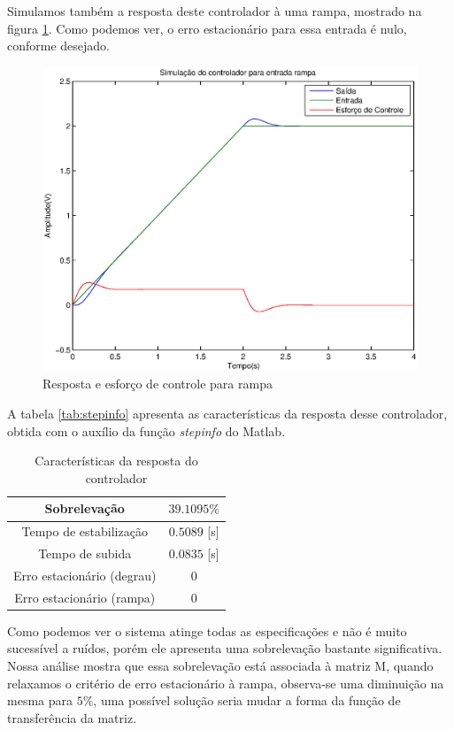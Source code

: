 \documentclass{article}
\begin{document}
Simulamos também a resposta deste controlador à uma rampa, mostrado na figura \ref{fig:yurR}. Como podemos ver, o erro estacionário para essa entrada é nulo, conforme desejado.
\begin{figure}[H]
	\centering
	\includegraphics[width=0.8\linewidth]{../yurR}
	\caption{Resposta e esforço de controle para rampa}
	\label{fig:yurR}
\end{figure}
A tabela \ref{tab:stepinfo} apresenta as características da resposta desse controlador, obtida com o auxílio da função \textit{stepinfo} do Matlab.
\begin{table}[H]
	\centering
	\caption{Características da resposta do controlador}
	\label{tab:avat}
	\begin{tabular}{|c|c|}
		\hline Sobrelevação 				& $39.1095\%$ \\ 
		\hline Tempo de estabilização 		& $0.5089$ [s]\\ 
		\hline Tempo de subida				& $0.0835$ [s]\\ 
		\hline Erro estacionário (degrau) 	& $0$\\ 
		\hline Erro estacionário (rampa) 	& $0$\\ 
		\hline 
	\end{tabular} 
\end{table}

Como podemos ver o sistema atinge todas as especificações e não é muito sucessível a ruídos, porém ele apresenta uma sobrelevação bastante significativa. Nossa análise mostra que essa sobrelevação está associada à matriz M, quando relaxamos o critério de erro estacionário à rampa, observa-se uma diminuição na mesma para $5\%$, uma possível solução seria mudar a forma da função de transferência da matriz. 
\begin{thebibliography}{widestlabel}
\end{thebibliography}
\end{document}
